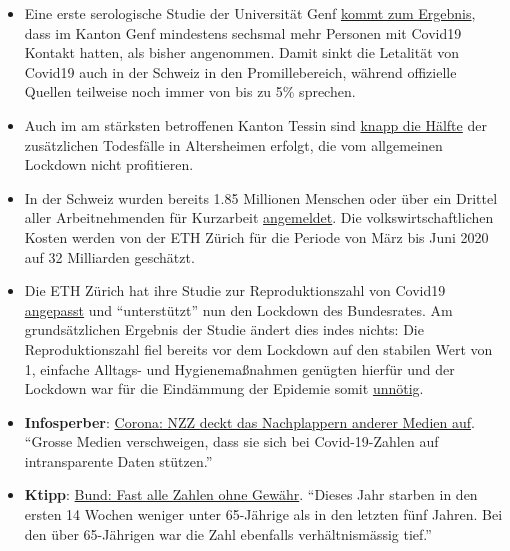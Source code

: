 \begin{itemize}
\tightlist
\item
  Eine erste serologische Studie der Universität Genf
  \href{https://www.hug-ge.ch/medias/communique-presse/seroprevalence-covid-19-premiere-estimation}{kommt
  zum Ergebnis}, dass im Kanton Genf mindestens sechsmal mehr Personen
  mit Covid19 Kontakt hatten, als bisher angenommen. Damit sinkt die
  Letalität von Covid19 auch in der Schweiz in den Promillebereich,
  während offizielle Quellen teilweise noch immer von bis zu 5\%
  sprechen.
\item
  Auch im am stärksten betroffenen Kanton Tessin sind
  \href{https://www.bluewin.ch/de/news/schweiz/sp-chef-levrat-will-die-reichen-schropfen-383977.html}{knapp
  die Hälfte} der zusätzlichen Todesfälle in Altersheimen erfolgt, die
  vom allgemeinen Lockdown nicht profitieren.
\item
  In der Schweiz wurden bereits 1.85 Millionen Menschen oder über ein
  Drittel aller Arbeitnehmenden für Kurzarbeit
  \href{https://www.bluewin.ch/de/news/schweiz/sp-chef-levrat-will-die-reichen-schropfen-383977.html}{angemeldet}.
  Die volkswirtschaftlichen Kosten werden von der ETH Zürich für die
  Periode von März bis Juni 2020 auf 32 Milliarden geschätzt.
\item
  Die ETH Zürich hat ihre Studie zur Reproduktionszahl von Covid19
  \href{https://www.nau.ch/politik/regional/coronavirus-eth-forscherin-passt-studie-an-und-stutzt-lockdown-65695817}{angepasst}
  und ``unterstützt'' nun den Lockdown des Bundesrates. Am
  grundsätzlichen Ergebnis der Studie ändert dies indes nichts: Die
  Reproduktionszahl fiel bereits vor dem Lockdown auf den stabilen Wert
  von 1, einfache Alltags- und Hygienemaßnahmen genügten hierfür und der
  Lockdown war für die Eindämmung der Epidemie somit
  \href{https://infekt.ch/2020/04/sind-wir-tatsaechlich-im-blindflug/}{unnötig}.
\item
  \textbf{Infosperber}:
  \href{https://www.infosperber.ch/Artikel/Medien/Corona-NZZ-deckt-das-Nachplappern-anderer-Medien-auf}{Corona:
  NZZ deckt das Nachplappern anderer Medien auf}. ``Grosse Medien
  verschweigen, dass sie sich bei Covid-19-Zahlen auf intransparente
  Daten stützen.''
\item
  \textbf{Ktipp}:
  \href{https://www.ktipp.ch/artikel/artikeldetail/bund-fast-alle-zahlen-ohne-gewaehr/}{Bund:
  Fast alle Zahlen ohne Gewähr}. ``Dieses Jahr starben in den ersten 14
  Wochen weniger unter 65-Jährige als in den letzten fünf Jahren. Bei
  den über 65-Jährigen war die Zahl ebenfalls verhältnismässig tief.''
\end{itemize}

